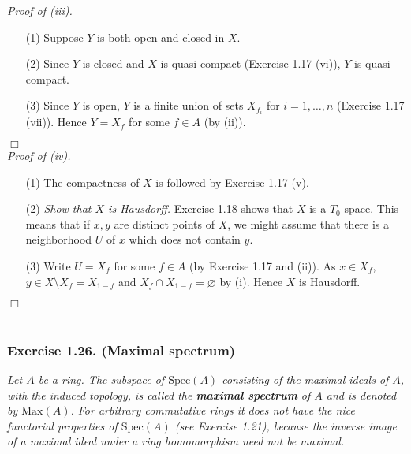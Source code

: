 \documentclass{article}
\begin{document}
\emph{Proof of (iii).}
\begin{enumerate}
\item[(1)]
  Suppose $Y$ is both open and closed in $X$.

\item[(2)]
  Since $Y$ is closed and $X$ is quasi-compact (Exercise 1.17 (vi)), $Y$ is quasi-compact.

\item[(3)]
  Since $Y$ is open, $Y$ is a finite union of sets $X_{f_i}$ for $i = 1, \ldots, n$ (Exercise 1.17 (vii)).
  Hence $Y = X_f$ for some $f \in A$ (by (ii)).
\end{enumerate}
$\Box$ \\



\emph{Proof of (iv).}
\begin{enumerate}
\item[(1)]
  The compactness of $X$ is followed by Exercise 1.17 (v).

\item[(2)]
  \emph{Show that $X$ is Hausdorff.}
  Exercise 1.18 shows that $X$ is a $T_0$-space.
  This means that if $x, y$ are distinct points of $X$,
  we might assume that there is a neighborhood $U$ of $x$ which does not contain $y$.

\item[(3)]
  Write $U = X_f$ for some $f \in A$ (by Exercise 1.17 and (ii)).
  As $x \in X_f$, $y \in X \setminus X_f = X_{1-f}$ and $X_f \cap X_{1-f} = \varnothing$ by (i).
  Hence $X$ is Hausdorff.
\end{enumerate}
$\Box$ \\\\












\subsubsection*{Exercise 1.26. (Maximal spectrum)}
\emph{Let $A$ be a ring.
The subspace of $\mathrm{Spec}(A)$ consisting of the maximal ideals of $A$,
with the induced topology,
is called the \textbf{maximal spectrum} of $A$ and is denoted by $\mathrm{Max}(A)$.
For arbitrary commutative rings
it does not have the nice functorial properties of $\mathrm{Spec}(A)$ (see Exercise 1.21),
because the inverse image of a maximal ideal under a ring homomorphism need not be maximal.} \\
\end{document}
